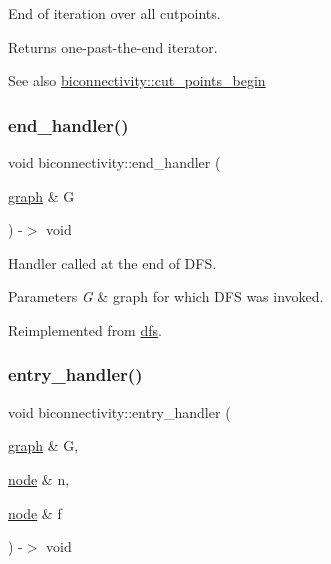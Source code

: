 End of iteration over all cutpoints. 

\begin{DoxyReturn}{Returns}
one-\/past-\/the-\/end iterator. 
\end{DoxyReturn}
\begin{DoxySeeAlso}{See also}
\mbox{\hyperlink{classbiconnectivity_ac1509d3ad82cdac1b55f50f051e39dde}{biconnectivity\+::cut\+\_\+points\+\_\+begin}} 
\end{DoxySeeAlso}
\mbox{\label{classbiconnectivity_a8f5e44d14a03d24c4ffd445ca0151517}} 
\subsubsection{\texorpdfstring{end\+\_\+handler()}{end\_handler()}}
{\footnotesize\ttfamily void biconnectivity\+::end\+\_\+handler (\begin{DoxyParamCaption}\item[{\mbox{\hyperlink{classgraph}{graph}} \&}]{G }\end{DoxyParamCaption}) -\/$>$ void\hspace{0.3cm}{\ttfamily [virtual]}}



Handler called at the end of D\+FS. 


\begin{DoxyParams}{Parameters}
{\em G} & graph for which D\+FS was invoked. \\
\hline
\end{DoxyParams}


Reimplemented from \mbox{\hyperlink{classdfs_ab96c7c6183856dd9e356fdcf50835b32}{dfs}}.

\mbox{\label{classbiconnectivity_a50b1ca6398fa0228e99a051855617315}} 
\subsubsection{\texorpdfstring{entry\+\_\+handler()}{entry\_handler()}}
{\footnotesize\ttfamily void biconnectivity\+::entry\+\_\+handler (\begin{DoxyParamCaption}\item[{\mbox{\hyperlink{classgraph}{graph}} \&}]{G,  }\item[{\mbox{\hyperlink{classnode}{node}} \&}]{n,  }\item[{\mbox{\hyperlink{classnode}{node}} \&}]{f }\end{DoxyParamCaption}) -\/$>$ void\hspace{0.3cm}{\ttfamily [virtual]}}



